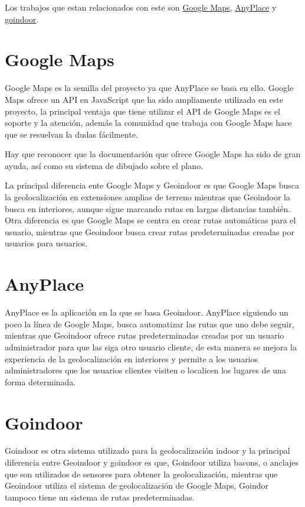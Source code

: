 
Los trabajos que estan relacionados con este son \href{https://www.google.es/maps}{Google Maps}, \href{https://anyplace.cs.ucy.ac.cy/}{AnyPlace} y \href{https://www.goindoor.co/}{goindoor}.

\section{Google Maps}\label{GoogleMaps}

Google Maps es la semilla del proyecto ya que AnyPlace se basa en ello.
Google Maps ofrece un API en JavaScript que ha sido ampliamente utilizada en este proyecto, la principal ventaja que tiene utilizar el API de Google Maps es el soporte y la atención, además la comunidad que trabaja con Google Maps hace que se resuelvan la dudas fácilmente. 

Hay que reconocer que la documentación que ofrece Google Maps ha sido de gran ayuda, así como su sistema de dibujado sobre el plano. 

La principal diferencia ente Google Maps y Geoindoor es que Google Maps busca la geolocalización en extensiones amplias de terreno mientras que Geoindoor la busca en interiores, aunque sigue marcando rutas en largas distancias también. Otra diferencia es que Google Maps se centra en crear rutas automáticas para el usuario, mientras que Geoindoor busca crear rutas predeterminadas creadas por usuarios para usuarios.


\section{AnyPlace}\label{AnyPlace}

AnyPlace es la aplicación en la que se basa Geoindoor. AnyPlace siguiendo un poco la línea de Google Maps, busca automatizar las rutas que uno debe seguir, mientras que Geoindoor ofrece rutas predeterminadas creadas por un usuario administrador para que las siga otro usuario cliente, de esta manera se mejora la experiencia de la geolocalización en interiores y permite a los usuarios administradores que los usuarios clientes visiten o localicen los lugares de una forma determinada.

\section{Goindoor}\label{goindoor}

Goindoor es otra sistema utilizado para la geolocalización indoor y la principal diferencia entre Geoindoor y goindoor es que, Goindoor utiliza bacons, o anclajes que son utilizados de sensores para obtener la geolocalización, mientras que Geoindoor utiliza el sistema de geolocalización de Google Maps, Goindor tampoco tiene un sistema de rutas predeterminadas.
